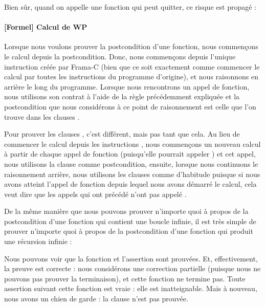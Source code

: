 

Bien sûr, quand on appelle une fonction qui peut quitter, ce risque est propagé :




\paragraph*{[Formel] Calcul de WP}


Lorsque nous voulons prouver la postcondition d'une fonction, nous commençons le
calcul depuis la postcondition. Donc, nous commençons depuis l'unique instruction
 créée par Frama-C (bien que ce soit exactement comme
commencer le calcul par toutes les instructions  du programme
d'origine), et nous raisonnons en arrière le long du programme. Lorsque nous
rencontrons un appel de fonction, nous utilisons son contrat à l'aide de la
règle précédemment expliquée et la postcondition que nous considérons à ce
point de raisonnement est celle  que l'on trouve dans les clauses
.


Pour prouver les clauses , c'est différent, mais pas tant que
cela. Au lieu de commencer le calcul depuis les instructions ,
nous commençons un nouveau calcul à partir de chaque appel de fonction
(puisqu'elle pourrait appeler ) et cet appel, nous utilisons la
clause  comme postcondition, ensuite, lorsque nous continuons
le raisonnement arrière, nous utilisons les clauses  comme
d'habitude puisque si nous avons atteint l'appel de fonction depuis lequel nous
avons démarré le calcul, cela veut dire que les appels qui ont précédé n'ont pas
appelé .



De la même manière que nous pouvons prouver n'importe quoi à propos de la
postcondition d'une fonction qui contient une boucle infinie, il est très simple
de prouver n'importe quoi à propos de la postcondition d'une fonction qui
produit une récursion infinie :






Nous pouvons voir que la fonction et l'assertion sont prouvées. Et, effectivement,
la preuve est correcte : nous considérons une correction partielle (puisque nous ne
pouvons pas prouver la terminaison), et cette fonction ne termine pas. Toute
assertion suivant cette fonction est vraie : elle est inatteignable. Mais à
nouveau, nous avons un chien de garde : la clause  n'est
pas prouvée.


